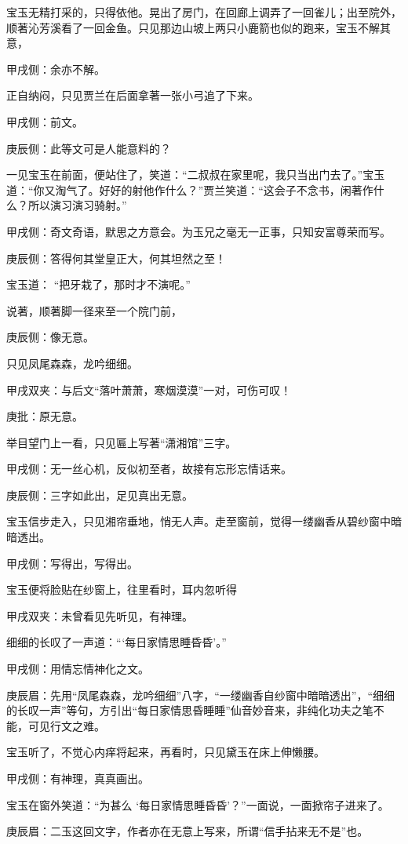 \begin{parag}
    宝玉无精打采的，只得依他。晃出了房门，在回廊上调弄了一回雀儿；出至院外，顺著沁芳溪看了一回金鱼。只见那边山坡上两只小鹿箭也似的跑来，宝玉不解其意，\begin{note}甲戌侧：余亦不解。\end{note}正自纳闷，只见贾兰在后面拿著一张小弓追了下来。\begin{note}甲戌侧：前文。\end{note}\begin{note}庚辰侧：此等文可是人能意料的？\end{note}一见宝玉在前面，便站住了，笑道：“二叔叔在家里呢，我只当出门去了。”宝玉道：“你又淘气了。好好的射他作什么？”贾兰笑道：“这会子不念书，闲著作什么？所以演习演习骑射。”\begin{note}甲戌侧：奇文奇语，默思之方意会。为玉兄之毫无一正事，只知安富尊荣而写。\end{note}\begin{note}庚辰侧：答得何其堂皇正大，何其坦然之至！\end{note}宝玉道： “把牙栽了，那时才不演呢。”
\end{parag}


\begin{parag}
    说著，顺著脚一径来至一个院门前，\begin{note}庚辰侧：像无意。\end{note}只见凤尾森森，龙吟细细。\begin{note}甲戌双夹：与后文“落叶萧萧，寒烟漠漠”一对，可伤可叹！\end{note}\begin{note}庚批：原无意。\end{note}举目望门上一看，只见匾上写著“潇湘馆”三字。\begin{note}甲戌侧：无一丝心机，反似初至者，故接有忘形忘情话来。\end{note}\begin{note}庚辰侧：三字如此出，足见真出无意。\end{note}宝玉信步走入，只见湘帘垂地，悄无人声。走至窗前，觉得一缕幽香从碧纱窗中暗暗透出。\begin{note}甲戌侧：写得出，写得出。\end{note}宝玉便将脸贴在纱窗上，往里看时，耳内忽听得\begin{note}甲戌双夹：未曾看见先听见，有神理。\end{note}细细的长叹了一声道：“‘每日家情思睡昏昏’。”\begin{note}甲戌侧：用情忘情神化之文。\end{note}\begin{note}庚辰眉：先用“凤尾森森，龙吟细细”八字，“一缕幽香自纱窗中暗暗透出”，“细细的长叹一声”等句，方引出“每日家情思昏睡睡”仙音妙音来，非纯化功夫之笔不能，可见行文之难。\end{note}宝玉听了，不觉心内痒将起来，再看时，只见黛玉在床上伸懒腰。\begin{note}甲戌侧：有神理，真真画出。\end{note}宝玉在窗外笑道：“为甚么 ‘每日家情思睡昏昏’？”一面说，一面掀帘子进来了。\begin{note}庚辰眉：二玉这回文字，作者亦在无意上写来，所谓“信手拈来无不是”也。\end{note}
\end{parag}


